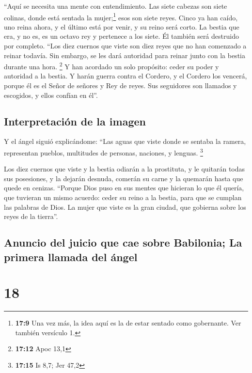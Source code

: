  ``Aquí se necesita una mente con entendimiento. Las siete
cabezas son siete colinas, donde está sentada la mujer;\footnote{\textbf{17:9}
  Una vez más, la idea aquí es la de estar sentado como gobernante. Ver
  también versículo 1.}  esos son siete reyes. Cinco ya
han caído, uno reina ahora, y el último está por venir, y su reino será
corto.  La bestia que era, y no es, es un octavo rey y
pertenece a los siete. Él también será destruido por completo.
 ``Los diez cuernos que viste son diez reyes que no han
comenzado a reinar todavía. Sin embargo, se les dará autoridad para
reinar junto con la bestia durante una hora. \footnote{\textbf{17:12}
  Apoc 13,1}  Y han acordado un solo propósito: ceder su
poder y autoridad a la bestia.  Y harán guerra contra el
Cordero, y el Cordero los vencerá, porque él es el Señor de señores y
Rey de reyes. Sus seguidores son llamados y escogidos, y ellos confían
en él''.

\hypertarget{interpretaciuxf3n-de-la-imagen}{%
\subsection{Interpretación de la
imagen}\label{interpretaciuxf3n-de-la-imagen}}

 Y el ángel siguió explicándome: ``Las aguas que viste
donde se sentaba la ramera, representan pueblos, multitudes de personas,
naciones, y lenguas. \footnote{\textbf{17:15} Is 8,7; Jer 47,2}

 Los diez cuernos que viste y la bestia odiarán a la
prostituta, y le quitarán todas sus posesiones, y la dejarán desnuda,
comerán su carne y la quemarán hasta que quede en cenizas.
 ``Porque Dios puso en sus mentes que hicieran lo que él
quería, que tuvieran un mismo acuerdo: ceder su reino a la bestia, para
que se cumplan las palabras de Dios.  La mujer que viste
es la gran ciudad, que gobierna sobre los reyes de la tierra''.

\hypertarget{anuncio-del-juicio-que-cae-sobre-babilonia-la-primera-llamada-del-uxe1ngel}{%
\subsection{Anuncio del juicio que cae sobre Babilonia; La primera
llamada del
ángel}\label{anuncio-del-juicio-que-cae-sobre-babilonia-la-primera-llamada-del-uxe1ngel}}

\hypertarget{section-17}{%
\section{18}\label{section-17}}

